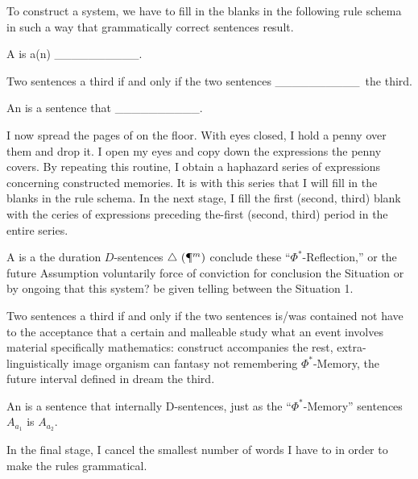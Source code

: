 To construct a system, we have to fill in the blanks in the following rule 
schema in such a way that grammatically correct sentences result. 

\newcommand{\blankspace}{\_\_\_\_\_\_\_\_\_\_}


\begin{sysrules}
A  is a(n) \blankspace.

Two sentences  a third if and only if the two sentences \blankspace\ the third. 

An  is a sentence that \blankspace.
\end{sysrules}


I now spread the pages of  on the floor. 
With eyes closed, I hold a penny over them and drop it. I open my eyes and 
copy down the expressions the penny covers. By repeating this routine, I 
obtain a haphazard series of expressions concerning constructed memories. It 
is with this series that I will fill in the blanks in the rule schema. In the next 
stage, I fill the first (second, third) blank with the ceries of expressions 
preceding the-first (second, third) period in the entire series. 


\begin{sysrules}
	A  is a the duration $D$-sentences $\triangle\ (\mathparagraph^m)$ conclude these 
\enquote{$\Phi^*$-Reflec\-tion,} or the future Assumption voluntarily force of 
conviction for conclusion the Situation or by ongoing that this 
system? be given telling between the Situation 1. 

Two sentences  a third if and only if the two sentences is\slash was 
contained not have to the acceptance that a certain and malleable 
study what an event involves material specifically mathematics: 
construct accompanies the rest, extra-linguistically image organism 
can fantasy not remembering $\Phi^*$-Memory, the future interval defined 
in dream the third. 

An  is a sentence that internally D-sentences, just as the 
\enquote{$\Phi^*$-Memory} sentences $A_{a_1}$ is $A_{a_2}$. 

In the final stage, I cancel the smallest number of words I have to in 
order to make the rules grammatical. 
\end{sysrules}

